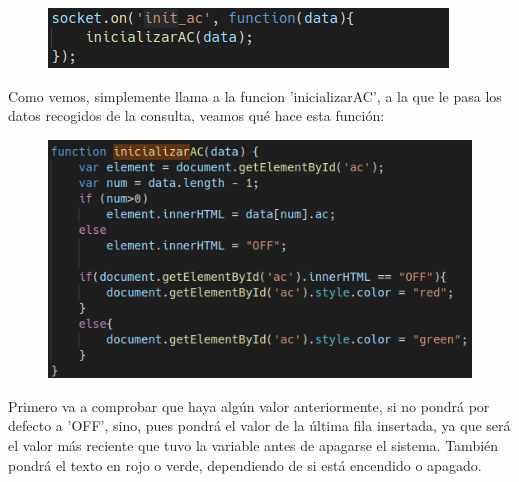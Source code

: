 \documentclass{article}
\begin{document}
	\begin{figure}[H]
		\centering
		\includegraphics[totalheight=1.8cm]{img/9.png}
	\end{figure}
	Como vemos, simplemente llama a la funcion 'inicializarAC', a la que le pasa los datos recogidos de la consulta, veamos qué hace esta función:
	\begin{figure}[H]
		\centering
		\includegraphics[totalheight=6.7cm]{img/10.png}
	\end{figure}
	Primero va a comprobar que haya algún valor anteriormente, si no pondrá por defecto a 'OFF', sino, pues pondrá el valor de la última fila insertada, ya que será el valor más reciente que tuvo la variable antes de apagarse el sistema. También pondrá el texto en rojo o verde, dependiendo de si está encendido o apagado.
	
\end{document}
